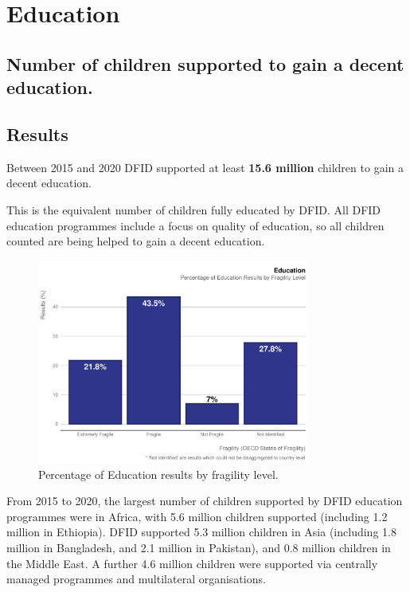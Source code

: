 \chapter{Education}

\section*{Number of children supported to gain a decent education.}

\thispagestyle{empty}



\section{Results}
Between 2015 and 2020 DFID supported at least \textbf{15.6 million} children to gain a decent education. %

This is the equivalent number of children fully educated by DFID. %
All DFID education programmes include a focus on quality of education, so all children counted are being helped to gain a decent education. %

\begin{figure}[htbp]
  \centering
\begin{knitrout}
\color{fgcolor}
\includegraphics[width=0.8\textwidth]{figs/education_fragility_plot-1} 

\end{knitrout}
  \caption{Percentage of Education results by fragility level.}
  \label{fig:edu_fragility_plot}
\end{figure}

From 2015 to 2020, the largest number of children supported by DFID education programmes were in Africa, with 5.6
million children supported (including
1.2
million in Ethiopia). %
DFID supported
5.3
million children in Asia (including
1.8
million in Bangladesh, and
2.1
million in Pakistan), and
0.8
million children in the Middle East. %
A further
4.6
million children were supported via centrally managed programmes and multilateral organisations. %

